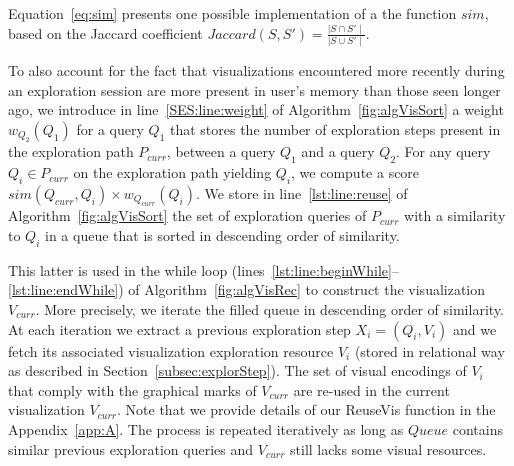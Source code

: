 %
Equation~\ref{eq:sim} presents one possible implementation of a the function $sim$, based on the Jaccard coefficient $Jaccard(S, S') = \frac{\mid S \cap S' \mid}{\mid S \cup S' \mid}$.

To also account for the fact that visualizations encountered more recently during an exploration session are more present in user's memory than those seen longer ago,  
we introduce in line~\ref{SES:line:weight} of Algorithm~\ref{fig:algVisSort} a weight $w_{Q_{2}}(Q_1)$ for a query $Q_1$ that stores the number of exploration steps present in the exploration path $P_{curr}$, between a query $Q_1$ and a query $Q_{2}$. 
For any query $Q_i \in P_{curr}$ on the exploration path yielding $Q_{i}$, we compute a score $sim(Q_{curr}, Q_i) \times w_{Q_{curr}}(Q_i)$. 
We store in line~\ref{lst:line:reuse} of Algorithm~\ref{fig:algVisSort} the set of exploration queries of $P_{curr}$ with a similarity to $Q_i$ in a queue that is sorted in descending order of similarity. 


This latter is used in the while loop (lines~\ref{lst:line:beginWhile}--\ref{lst:line:endWhile}) of Algorithm~\ref{fig:algVisRec} to construct the visualization $V_{curr}$.
More precisely, we iterate the filled queue in descending order of similarity. At each iteration we extract a previous exploration step $X_i=(Q_{i},V_{i})$ and we fetch its associated visualization exploration resource $V_i$ (stored in relational way as described in Section~\ref{subsec:explorStep}).  The set of visual encodings of $V_i$ that comply with the graphical marks of $V_{curr}$ are re-used in the current visualization $V_{curr}$. Note that we provide details of our ReuseVis function in the Appendix~\ref{app:A}.
The process is repeated iteratively as long as $Queue$ contains similar previous exploration queries and $V_{curr}$ still lacks some visual resources.



